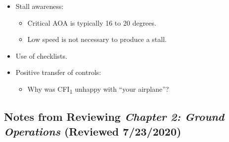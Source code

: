 \documentclass[letterpaper,10pt,titlepage]{article}
\begin{document}
\begin{itemize}
	  \item Stall awareness:
	        \begin{itemize}
			\item Critical AOA is typically 16 to 20 degrees.
            \item Low speed is not necessary to produce a stall.
			\end{itemize}
	  \item Use of checklists.
      \item Positive transfer of controls:	  
	        \begin{itemize}
			\item Why was CFI\textsubscript{1} unhappy with ``your airplane''?
			\end{itemize}
\end{itemize}


\subsection{Notes from Reviewing \emph{Chapter 2:  Ground Operations}
            (Reviewed 7/23/2020)}
\label{snra0:sgop0}
\end{document}
